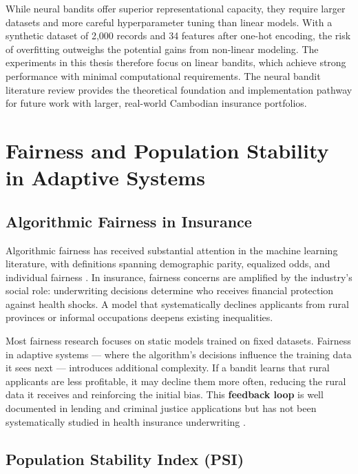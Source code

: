 While neural bandits offer superior representational capacity, they require larger datasets and more careful hyperparameter tuning than linear models. With a synthetic dataset of 2,000 records and 34 features after one-hot encoding, the risk of overfitting outweighs the potential gains from non-linear modeling. The experiments in this thesis therefore focus on linear bandits, which achieve strong performance with minimal computational requirements. The neural bandit literature review provides the theoretical foundation and implementation pathway for future work with larger, real-world Cambodian insurance portfolios.

\section{Fairness and Population Stability in Adaptive Systems}\label{fairness-and-population-stability-in-adaptive-systems}

\subsection{Algorithmic Fairness in Insurance}\label{algorithmic-fairness-in-insurance}

Algorithmic fairness has received substantial attention in the machine learning literature, with definitions spanning demographic parity, equalized odds, and individual fairness \citep{Barocas2019}. In insurance, fairness concerns are amplified by the industry's social role: underwriting decisions determine who receives financial protection against health shocks. A model that systematically declines applicants from rural provinces or informal occupations deepens existing inequalities.

Most fairness research focuses on static models trained on fixed datasets. Fairness in adaptive systems --- where the algorithm's decisions influence the training data it sees next --- introduces additional complexity. If a bandit learns that rural applicants are less profitable, it may decline them more often, reducing the rural data it receives and reinforcing the initial bias. This \textbf{feedback loop} is well documented in lending and criminal justice applications but has not been systematically studied in health insurance underwriting \citep{Ensign2018}.

\subsection{Population Stability Index (PSI)}\label{population-stability-index-psi}

